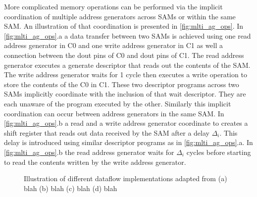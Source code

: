 More complicated memory operations can be performed via the implicit
coordination of multiple address generators across SAMs or within the same SAM.
An illustration of that coordination is presented in \autoref{fig:mlti_ag_ops}.
In \autoref{fig:mlti_ag_ops}.a a data transfer between two SAMs is achieved
using one read address generator in C0 and one write address generator in C1 as
well a connection between the dout pins of C0 and dout pins of C1.
The read address generator executes a generate descriptor that reads out the
contents of the SAM. The write address generator waits for 1 cycle then executes
a write operation to store the contents of the C0 in C1. These two descriptor
programs across two SAMs implicitly coordinate with the inclusion of that wait
descriptor. They are each unaware of the program executed by the other.
Similarly this implicit coordination can occur between address generators in the
same SAM. In \autoref{fig:mlti_ag_ops}.b a read and a write address generator
coordinate to creates a shift register that reads out data received by the SAM
after a delay $\Delta_i$. This delay is introduced using similar descriptor
programs as in \autoref{fig:mlti_ag_ops}.a. In \autoref{fig:mlti_ag_ops}.b the
read address generator waits for $\Delta_i$ cycles before starting to read the
contents written by the write address generator.

\begin{figure}
    \centering
    \caption{Illustration of different dataflow implementations adapted from \cite{dnn_df_overrated} (a) blah (b) blah (c) blah (d) blah}
    \label{fig:mlti_ag_ops}
\end{figure}



